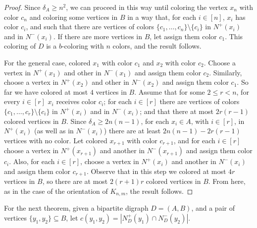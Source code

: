 \documentclass[12pt]{article}
\begin{document}
\begin{proof}
 Since $\delta_A\geq n^2$, we can proceed in this way until coloring the vertex $x_n$ with color $c_n$ and coloring some vertices in $B$ in a way that, for each $i\in [n]$, $x_i$ has color $c_i$, and such that there are vertices of colors $\{c_1, \dots, c_n\}\setminus\{c_i\}$ in $N^+(x_i)$ and in $N^-(x_i)$. 
If there are more vertices in $B$, let assign them color $c_1$. This coloring of $D$ is a $b$-coloring with $n$ colors, and the result follows. 

For the general case, colored $x_1$ with color $c_1$ and $x_2$ with color $c_2$. Choose a vertex in $N^+(x_1)$ and other in $N^-(x_1)$  and assign them color $c_2$. Similarly, choose a vertex in $N^+(x_2)$ and other in $N^-(x_2)$  and assign them color $c_1$. So far we have colored at most $4$ vertices in $B$.
Assume that for some $2\leq r<n$, for every $i\in [r]$ $x_i$ receives color $c_i$; for each $i\in[r]$ there are vertices of colors $\{c_1, \dots, c_r\}\setminus\{c_i\}$ in $N^+(x_i)$ and in $N^-(x_i)$; and that there at most $2r(r-1)$ colored vertices in $B$. Since $\delta_A \geq 2n(n-1)$, for each $x_i\in A$, with $i\in [r]$, in $N^+(x_i)$ (as well as in $N^-(x_i)$) there are at least $2n(n-1)-2r(r-1)$ vertices with no color. Let colored $x_{r+1}$ with color $c_{r+1}$, and for each $i\in[r]$ choose a vertex in $N^+(x_{r+1})$ and another in $N^-(x_{r+1})$ and assign them color $c_i$. Also, for each $i\in [r]$, choose a vertex in $N^+(x_{i})$ and another in $N^-(x_{i})$ and assign them color $c_{r+1}$.
Observe that in this step we colored at most $4r$ vertices in $B$, so there are at most $2(r+1)r$ colored vertices in $B$. From here, as in the case of the orientation of $K_{n,m}$, the result follows. \end{proof}






For the next theorem, given  a bipartite  digraph $D =(A, B)$, and a pair of vertices  $\{y_1, y_2\}\subseteq B$,  let $c(y_1, y_2)= |N_D^+(y_1)\cap N_D^-(y_2)|$.
\end{document}

